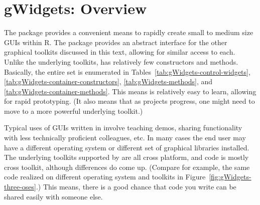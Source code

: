






 
\newcommand{\ONLYIN}[1]{[only in #1]}

\chapter{gWidgets: Overview}
\label{sec:overview}




The  package provides a convenient means to rapidly
create small to medium size GUIs within R. The package provides an
abstract interface for the other graphical toolkits discussed in this
text, allowing for similar access to each. Unlike the underlying
toolkits,  has relatively few constructors and
methods. Basically, the entire set is enumerated in
Tables~\ref{tab:gWidgets-control-widgets},
\ref{tab:gWidgets-container-constructors}, \ref{tab:gWidgets-methods},
and \ref{tab:gWidgets-container-methods}. This means  is
relatively easy to learn, allowing for rapid prototyping. (It also
means that as projects progress, one might need to move to a more
powerful underlying toolkit.) 

Typical uses of GUIs written in \R{} involve teaching demos, sharing
functionality with less technically proficient colleagues, etc. In
many cases the end user may have a different operating system or
different set of graphical libraries installed.  The underlying
toolkits supported by  are all cross platform, and
 code is mostly cross toolkit, although differences do
come up. (Compare for example, the same code realized on different
operating system and toolkits in
Figure~\ref{fig:gWidgets-three-oses}.) This means, there is a good
chance that code you write can be shared easily with someone else.



